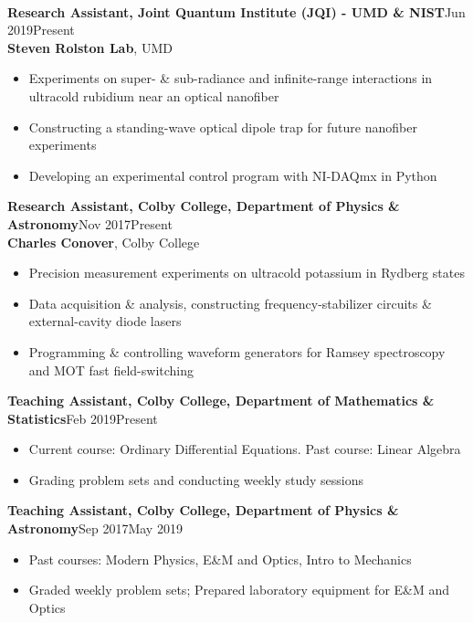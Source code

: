 \documentclass[letter, 9pt]{article}
\newcommand{\longunderline}[1]{\uline{#1\hfill\mbox{}}}
\begin{document}
	\vspace{-7pt}
	\noindent \longunderline{\normalsize{{}}}
	\\ \vspace{-7pt}
	
	\noindent \textbf{Research Assistant, Joint Quantum Institute (JQI) -  UMD \&  NIST}\hfill Jun 2019\textemdash Present\\ 
	\noindent \textbf{Steven Rolston Lab}, UMD
	\begin{itemize}[noitemsep, nolistsep]
		\item Experiments on super- \& sub-radiance and infinite-range interactions in ultracold rubidium near an optical nanofiber
		\item Constructing a standing-wave optical dipole trap for future nanofiber experiments
		\item Developing an experimental control program with NI-DAQmx in Python
	\end{itemize}
	\textbf{Research Assistant, Colby College, Department of Physics \& Astronomy}\hfill Nov 2017\textemdash Present\\
	\textbf{Charles Conover}, Colby College
	\begin{itemize}[noitemsep, nolistsep]
		\item Precision measurement experiments on ultracold potassium in Rydberg states
		\item Data acquisition \& analysis, constructing frequency-stabilizer circuits \& external-cavity diode lasers
		\item Programming \& controlling waveform generators for Ramsey spectroscopy and MOT fast field-switching

	\end{itemize}	
 	  \textbf{Teaching Assistant, Colby College, Department of Mathematics \& Statistics}\hfill Feb 2019\textemdash Present 
	\begin{itemize}[noitemsep, nolistsep]
		\item Current course: Ordinary Differential Equations. Past course: Linear Algebra
		\item Grading problem sets and conducting weekly study sessions 
	\end{itemize}
	 \textbf{Teaching Assistant, Colby College, Department of Physics \& Astronomy}\hfill Sep 2017\textemdash May 2019
	\begin{itemize}[noitemsep, nolistsep]
		\item Past courses: Modern Physics, E\&M and Optics, Intro to Mechanics
		\item Graded weekly problem sets; Prepared laboratory equipment for E\&M and Optics
	\end{itemize}
\end{document}
